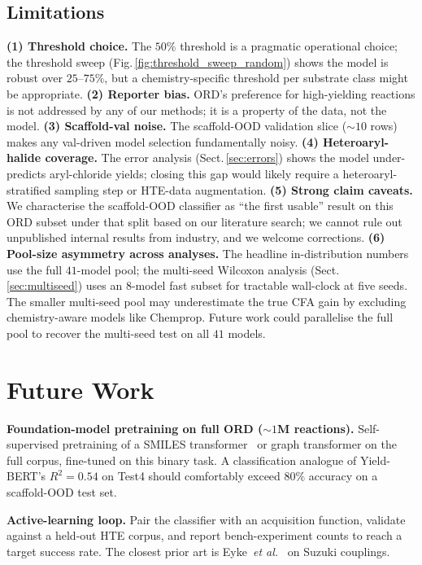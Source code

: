 \documentclass[conference]{IEEEtran}
\begin{document}
\subsection{Limitations}
\textbf{(1) Threshold choice.} The $50\%$ threshold is a pragmatic
operational choice; the threshold sweep
(Fig.\,\ref{fig:threshold_sweep_random}) shows the model is robust over
$25$--$75\%$, but a chemistry-specific threshold per substrate class
might be appropriate.
\textbf{(2) Reporter bias.} ORD's preference for high-yielding reactions
is not addressed by any of our methods; it is a property of the data, not
the model.
\textbf{(3) Scaffold-val noise.} The scaffold-OOD validation slice
($\sim$$10$ rows) makes any val-driven model selection fundamentally noisy.
\textbf{(4) Heteroaryl-halide coverage.} The error analysis
(Sect.\,\ref{sec:errors}) shows the model under-predicts aryl-chloride
yields; closing this gap would likely require a heteroaryl-stratified
sampling step or HTE-data augmentation.
\textbf{(5) Strong claim caveats.} We characterise the scaffold-OOD
classifier as ``the first usable'' result on this ORD subset under that
split based on our literature search; we cannot rule out unpublished
internal results from industry, and we welcome corrections.
\textbf{(6) Pool-size asymmetry across analyses.} The headline
in-distribution numbers use the full $41$-model pool; the multi-seed
Wilcoxon analysis (Sect.\,\ref{sec:multiseed}) uses an $8$-model
fast subset for tractable wall-clock at five seeds. The smaller
multi-seed pool may underestimate the true CFA gain by excluding
chemistry-aware models like Chemprop. Future work could parallelise the
full pool to recover the multi-seed test on all $41$ models.

\section{Future Work}
\label{sec:future}

\textbf{Foundation-model pretraining on full ORD ($\sim$$1$M reactions).}
Self-supervised pretraining of a SMILES transformer~\cite{Chithrananda2020}
or graph transformer on the full corpus, fine-tuned on this binary task.
A classification analogue of Yield-BERT's $R^{2}\!=\!0.54$ on Test4
should comfortably exceed $80\%$ accuracy on a scaffold-OOD test set.

\textbf{Active-learning loop.}
Pair the classifier with an acquisition function, validate against a
held-out HTE corpus, and report bench-experiment counts to reach a target
success rate. The closest prior art is Eyke~\textit{et al.}~\cite{Eyke2020}
on Suzuki couplings.
\end{document}
